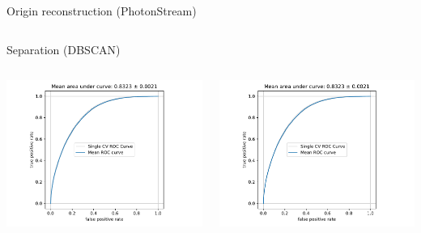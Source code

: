 \begin{frame}{Origin reconstruction (PhotonStream)}
\begin{columns}[onlytextwidth]
\begin{column}{0.475\textwidth}
    \end{column}
  \end{columns}
\end{frame}

\begin{frame}[t]{Separation (DBSCAN)}
\begin{columns}[onlytextwidth]
\begin{column}{0.475\textwidth}
  \centering
  \includegraphics[width=1.1\textwidth, page=1]{fig/separation_performance_DBSCAN.pdf}
\end{column}
\hfill%
\begin{column}{0.475\textwidth}
    \centering
    \includegraphics[width=\textwidth, page=2]{fig/separation_performance_DBSCAN.pdf}
\end{column}
\end{columns}
\end{frame}


